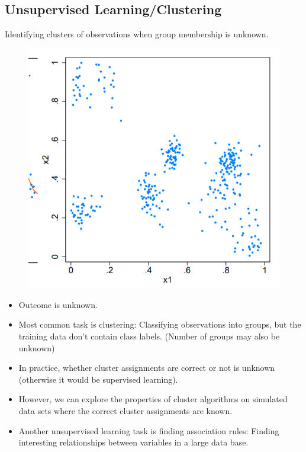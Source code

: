 \documentclass[12pt, oneside]{article}
\begin{document}
\subsection{Unsupervised Learning/Clustering}

Identifying clusters of observations when group membership is 
unknown.

\begin{figure}[!ht]
    \centering
    \includegraphics[width=\textwidth]{    Unsupervised Learning Finding clusters of observations.png}        
    \label{fig:my_label}
\end{figure}

\begin{itemize}
    \item Outcome is unknown.
    \item Most common task is clustering: Classifying observations into groups, but the training data don't contain class labels. (Number of groups may also be unknown)
    \item In practice, whether cluster assignments are correct or not is unknown (otherwise it would be supervised learning).
    \item However, we can explore the properties of cluster algorithms on simulated data sets where the correct cluster assignments are known. 
    \item Another unsupervised learning task is finding association rules: Finding interesting relationships between variables in a large data base.
\end{itemize}
\end{document}
